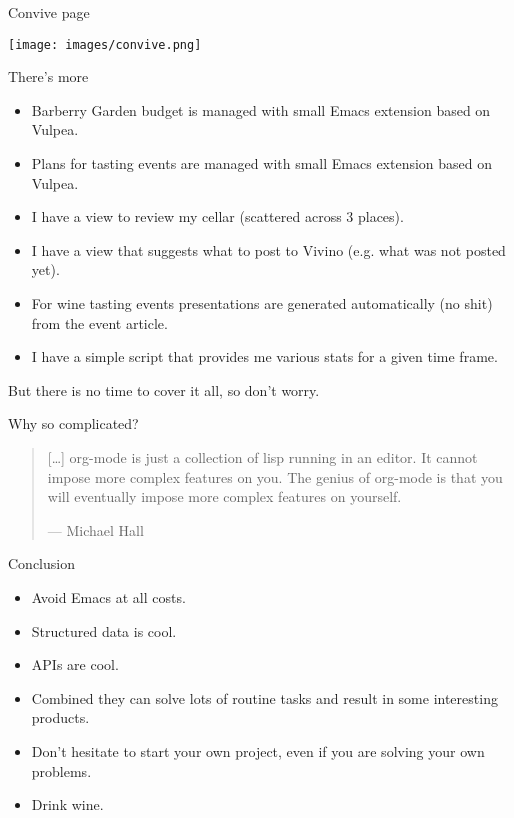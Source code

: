 \documentclass[presentation,aspectratio=169,smaller]{beamer}
\begin{document}
\begin{frame}[label={sec:org8f9735a}]{Convive page}
\begin{center}
\texttt{[image: images/convive.png]}
\end{center}
\end{frame}

\begin{frame}[label={sec:orgc2e0909}]{There's more}
\begin{itemize}
\item Barberry Garden budget is managed with small Emacs extension based on Vulpea.
\item Plans for tasting events are managed  with small Emacs extension based on Vulpea.
\item I have a view to review my cellar (scattered across 3 places).
\item I have a view that suggests what to post to Vivino (e.g. what was not posted yet).
\item For wine tasting events presentations are generated automatically (no shit) from the event article.
\item I have a simple script that provides me various stats for a given time frame.
\end{itemize}

But there is no time to cover it all, so don't worry.
\end{frame}

\begin{frame}[label={sec:orgcaaccd7}]{Why so complicated?}
\begin{quote}
[…] org-mode is just a collection of lisp running in an editor. It cannot impose more complex features on you. \alert{The genius of org-mode is that you will eventually impose more complex features on yourself.}

--- Michael Hall
\end{quote}
\end{frame}

\begin{frame}[label={sec:org9ebc35d}]{Conclusion}
\begin{itemize}
\item Avoid Emacs at all costs.
\item Structured data is cool.
\item APIs are cool.
\item Combined they can solve lots of routine tasks and result in some interesting products.
\item Don't hesitate to start your own project, even if you are solving your own problems.
\item Drink wine.
\end{itemize}
\end{frame}
\end{document}
